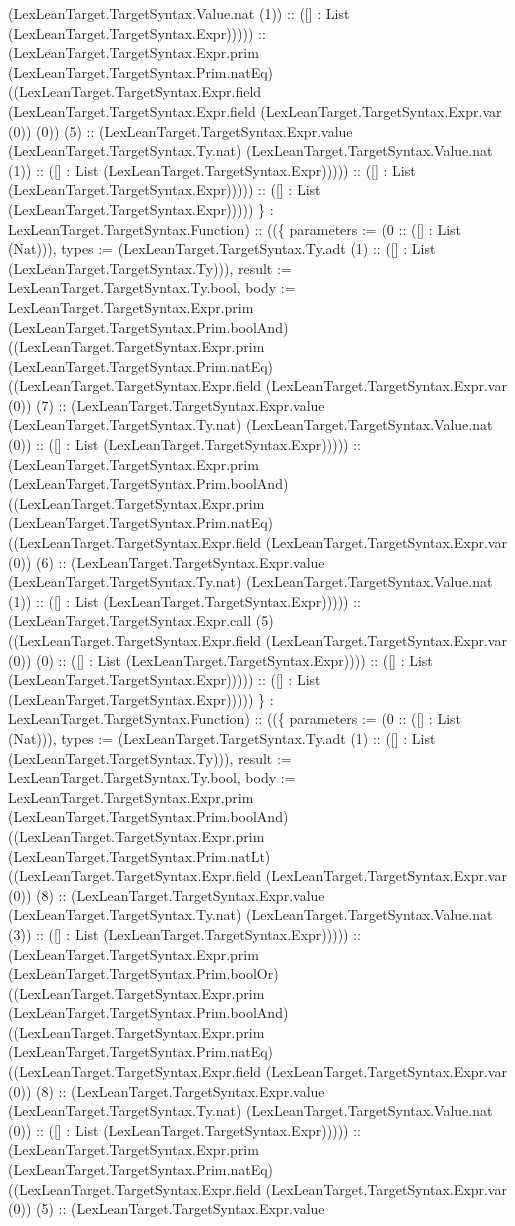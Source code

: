 \documentclass[11pt]{article}
\begin{document}
(LexLeanTarget.TargetSyntax.Value.nat (1)) :: ([] : List (LexLeanTarget.TargetSyntax.Expr))))) :: (LexLeanTarget.TargetSyntax.Expr.prim (LexLeanTarget.TargetSyntax.Prim.natEq) ((LexLeanTarget.TargetSyntax.Expr.field (LexLeanTarget.TargetSyntax.Expr.field (LexLeanTarget.TargetSyntax.Expr.var (0)) (0)) (5) :: (LexLeanTarget.TargetSyntax.Expr.value (LexLeanTarget.TargetSyntax.Ty.nat) (LexLeanTarget.TargetSyntax.Value.nat (1)) :: ([] : List (LexLeanTarget.TargetSyntax.Expr))))) :: ([] : List (LexLeanTarget.TargetSyntax.Expr))))) :: ([] : List (LexLeanTarget.TargetSyntax.Expr))))) \} : LexLeanTarget.TargetSyntax.Function) :: ((\{ parameters := (0 :: ([] : List (Nat))), types := (LexLeanTarget.TargetSyntax.Ty.adt (1) :: ([] : List (LexLeanTarget.TargetSyntax.Ty))), result := LexLeanTarget.TargetSyntax.Ty.bool, body := LexLeanTarget.TargetSyntax.Expr.prim (LexLeanTarget.TargetSyntax.Prim.boolAnd) ((LexLeanTarget.TargetSyntax.Expr.prim (LexLeanTarget.TargetSyntax.Prim.natEq) ((LexLeanTarget.TargetSyntax.Expr.field (LexLeanTarget.TargetSyntax.Expr.var (0)) (7) :: (LexLeanTarget.TargetSyntax.Expr.value (LexLeanTarget.TargetSyntax.Ty.nat) (LexLeanTarget.TargetSyntax.Value.nat (0)) :: ([] : List (LexLeanTarget.TargetSyntax.Expr))))) :: (LexLeanTarget.TargetSyntax.Expr.prim (LexLeanTarget.TargetSyntax.Prim.boolAnd) ((LexLeanTarget.TargetSyntax.Expr.prim (LexLeanTarget.TargetSyntax.Prim.natEq) ((LexLeanTarget.TargetSyntax.Expr.field (LexLeanTarget.TargetSyntax.Expr.var (0)) (6) :: (LexLeanTarget.TargetSyntax.Expr.value (LexLeanTarget.TargetSyntax.Ty.nat) (LexLeanTarget.TargetSyntax.Value.nat (1)) :: ([] : List (LexLeanTarget.TargetSyntax.Expr))))) :: (LexLeanTarget.TargetSyntax.Expr.call (5) ((LexLeanTarget.TargetSyntax.Expr.field (LexLeanTarget.TargetSyntax.Expr.var (0)) (0) :: ([] : List (LexLeanTarget.TargetSyntax.Expr)))) :: ([] : List (LexLeanTarget.TargetSyntax.Expr))))) :: ([] : List (LexLeanTarget.TargetSyntax.Expr))))) \} : LexLeanTarget.TargetSyntax.Function) :: ((\{ parameters := (0 :: ([] : List (Nat))), types := (LexLeanTarget.TargetSyntax.Ty.adt (1) :: ([] : List (LexLeanTarget.TargetSyntax.Ty))), result := LexLeanTarget.TargetSyntax.Ty.bool, body := LexLeanTarget.TargetSyntax.Expr.prim (LexLeanTarget.TargetSyntax.Prim.boolAnd) ((LexLeanTarget.TargetSyntax.Expr.prim (LexLeanTarget.TargetSyntax.Prim.natLt) ((LexLeanTarget.TargetSyntax.Expr.field (LexLeanTarget.TargetSyntax.Expr.var (0)) (8) :: (LexLeanTarget.TargetSyntax.Expr.value (LexLeanTarget.TargetSyntax.Ty.nat) (LexLeanTarget.TargetSyntax.Value.nat (3)) :: ([] : List (LexLeanTarget.TargetSyntax.Expr))))) :: (LexLeanTarget.TargetSyntax.Expr.prim (LexLeanTarget.TargetSyntax.Prim.boolOr) ((LexLeanTarget.TargetSyntax.Expr.prim (LexLeanTarget.TargetSyntax.Prim.boolAnd) ((LexLeanTarget.TargetSyntax.Expr.prim (LexLeanTarget.TargetSyntax.Prim.natEq) ((LexLeanTarget.TargetSyntax.Expr.field (LexLeanTarget.TargetSyntax.Expr.var (0)) (8) :: (LexLeanTarget.TargetSyntax.Expr.value (LexLeanTarget.TargetSyntax.Ty.nat) (LexLeanTarget.TargetSyntax.Value.nat (0)) :: ([] : List (LexLeanTarget.TargetSyntax.Expr))))) :: (LexLeanTarget.TargetSyntax.Expr.prim (LexLeanTarget.TargetSyntax.Prim.natEq) ((LexLeanTarget.TargetSyntax.Expr.field (LexLeanTarget.TargetSyntax.Expr.var (0)) (5) :: (LexLeanTarget.TargetSyntax.Expr.value 
\end{document}
